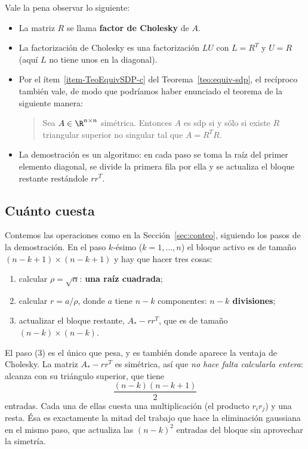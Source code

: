 \begin{remark} Vale la pena observar lo siguiente:
  \begin{itemize}
  \item
    La matriz $R$ se llama \textbf{factor de Cholesky} de $A$.
  \item
    La factorización de Cholesky es una factorización $LU$ con $L=R^T$ y
    $U=R$ (aquí $L$ no tiene unos en la diagonal).
  \item
    Por el ítem~\ref{item-TeoEquivSDP-c} del Teorema~\ref{teo:equiv-sdp}, el
    recíproco también vale, de modo que podríamos haber enunciado el teorema
    de la siguiente manera:
    \begin{quote}
      Sea $A \in \R^{n\times n}$ simétrica. Entonces $A$ es sdp si y sólo si
      existe $R$ triangular superior no singular tal que $A = R^T R$.
    \end{quote}
  \item
    La demostración es un algoritmo: en cada paso se toma la raíz del primer
    elemento diagonal, se divide la primera fila por ella y se actualiza el
    bloque restante restándole $rr^T$.
  \end{itemize}
\end{remark}

\subsection*{Cuánto cuesta}

Contemos las operaciones como en la Sección~\ref{sec:conteo}, siguiendo los
pasos de la demostración. En el paso $k$-ésimo ($k=1,\dots,n$) el bloque
activo es de tamaño $(n-k+1)\times(n-k+1)$ y hay que hacer tres cosas:
\begin{enumerate}[label=\textbf{(\arabic*)},leftmargin=*,itemsep=2pt]
\item calcular $\rho=\sqrt{\alpha}$: \textbf{una raíz cuadrada};
\item calcular $r=a/\rho$, donde $a$ tiene $n-k$ componentes:
\textbf{$n-k$ divisiones};
\item actualizar el bloque restante, $A_*-rr^T$, que es de tamaño
$(n-k)\times(n-k)$.
\end{enumerate}
El paso (3) es el único que pesa, y es también donde aparece la ventaja de
Cholesky. La matriz $A_*-rr^T$ es simétrica, así que \emph{no hace falta
calcularla entera}: alcanza con su triángulo superior, que tiene
\[
\frac{(n-k)(n-k+1)}{2}
\]
entradas. Cada una de ellas cuesta una multiplicación (el producto
$r_ir_j$) y una resta. Ésa es exactamente la mitad del trabajo que hace la
eliminación gaussiana en el mismo paso, que actualiza las $(n-k)^2$ entradas
del bloque sin aprovechar la simetría.

